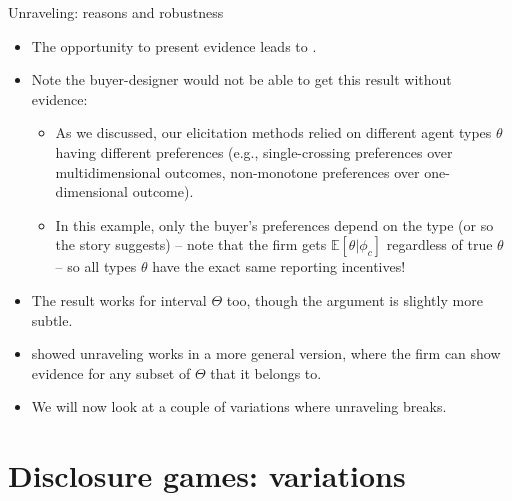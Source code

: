 \documentclass[english,10pt
,aspectratio=169
]{beamer}
\begin{document}
\begin{frame}{Unraveling: reasons and robustness}
	\begin{itemize}
		\item The opportunity to present evidence leads to .
		\item Note the buyer-designer would \alert{not be able} to get this result \alert{without evidence}:
		\begin{itemize}
			\item As we discussed, our elicitation methods relied on different agent types $\theta$ having different preferences (e.g., single-crossing preferences over multidimensional outcomes, non-monotone preferences over one-dimensional outcome).
			
			\item In this example, only the buyer's preferences depend on the type (or so the story suggests) -- note that the firm gets $\mathbb{E}[\theta | \phi_c]$ regardless of true $\theta$ -- so all types $\theta$ have the exact same reporting incentives! 
		\end{itemize}
		\pause
		\item The result works for interval $\Theta$ too, though the argument is slightly more subtle. 
		\item \cite{milgrom_good_1981} showed unraveling works in a more general version, where the firm can show evidence for any subset of $\Theta$ that it belongs to.
		\item We will now look at a couple of variations where unraveling \alert{breaks}.
	\end{itemize}
\end{frame}


\section{Disclosure games: variations}
\end{document}
